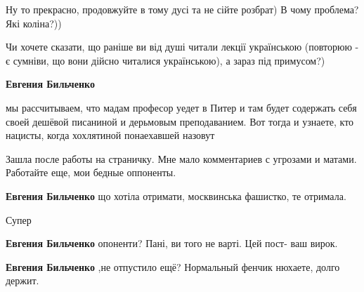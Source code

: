 \begin{itemize}
\begin{itemize}
Ну то прекрасно, продовжуйте в тому дусі та не сійте розбрат) В чому проблема? Які коліна?))

Чи хочете сказати, що раніше ви від душі читали лекції українською (повторюю -
є сумніви, що вони дійсно читалися українською), а зараз під примусом?)



\textbf{Евгения Бильченко} 

мы рассчитываем, что мадам професор уедет в Питер и там будет содержать себя
своей дешёвой писаниной и дерьмовым преподаванием. Вот тогда и узнаете, кто
нацисты, когда хохлятиной понаехавшей назовут
\end{itemize}



Зашла после работы на страничку. Мне мало комментариев с угрозами и матами.
Работайте еще, мои бедные оппоненты.

\begin{itemize}

\textbf{Евгения Бильченко} що хотіла отримати, москвинська фашистко, те отримала.


Супер


\textbf{Евгения Бильченко} опоненти? Пані, ви того не варті.
Цей пост- ваш вирок.


\textbf{Евгения Бильченко} ,не отпустило ещё? Нормальный фенчик нюхаете, долго держит.



\end{itemize}
\end{itemize}
